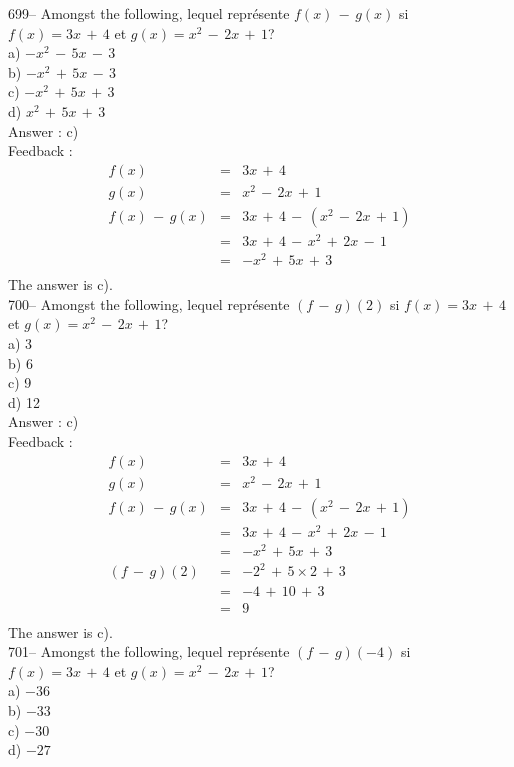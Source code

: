 \documentclass[letterpaper, 12pt]{article}
\begin{document}
699-- Amongst the following, lequel repr\'esente $f(x)\,-\,g(x)$
si $f(x)=3x\,+\,4$ et $g(x)=x^{2}\,-\,2x\,+\,1$?\\
a) $-x^{2}\,-\,5x\,-\,3$\\
b) $-x^{2}\,+\,5x\,-\,3$\\
c) $-x^{2}\,+\,5x\,+\,3$\\
d) $x^{2}\,+\,5x\,+\,3$\\

Answer : c)\\

Feedback : \\
\begin{eqnarray*}
f(x)&=&3x\,+\,4\\
g(x)&=&x^{2}\,-\,2x\,+\,1\\
f(x)\,-\,g(x)&=&3x\,+\,4\,-\,(x^{2}\,-\,2x\,+\,1)\\
&=&3x\,+\,4\,-\,x^{2}\,+\,2x\,-\,1\\
&=&-x^{2}\,+\,5x\,+\,3\\
\end{eqnarray*}
The answer is c).\\

700-- Amongst the following, lequel repr\'esente $(f\,-\,g)(2)$
si $f(x)=3x\,+\,4$ et $g(x)=x^{2}\,-\,2x\,+\,1$?\\
a) 3\\
b) 6\\
c) 9\\
d) 12\\

Answer : c)\\

Feedback : \\
\begin{eqnarray*}
f(x)&=&3x\,+\,4\\
g(x)&=&x^{2}\,-\,2x\,+\,1\\
f(x)\,-\,g(x)&=&3x\,+\,4\,-\,(x^{2}\,-\,2x\,+\,1)\\
&=&3x\,+\,4\,-\,x^{2}\,+\,2x\,-\,1\\
&=&-x^{2}\,+\,5x\,+\,3\\
(f\,-\,g)(2)&=& - 2^{2}\,+\,5\times2\,+\,3\\
&=&-4\,+\,10\,+\,3\\
&=&9\\
\end{eqnarray*}
The answer is c).\\

701-- Amongst the following, lequel repr\'esente $(f\,-\,g)(-4)$
si $f(x)=3x\,+\,4$ et $g(x)=x^{2}\,-\,2x\,+\,1$?\\
a) $-36$\\
b) $-33$\\
c) $-30$\\
d) $-27$\\
\end{document}

